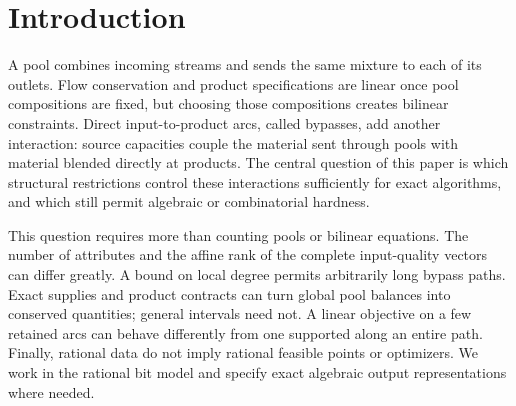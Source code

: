 \begin{abstract}
Pooling couples linear network flows through the requirement that every
outlet of a pool has the same mixture. We study which restrictions on
network structure, quality data and contracts make exact feasibility
and optimization tractable. Rational pooling threshold problems are
complete for the existential theory of the reals even with one attribute
and no bypasses, or with one pool and growing attribute dimension.
Fixed nonlinear parameter counts instead yield polynomial-size
basis-index certificates, but do not alone imply polynomial algorithms.
We give sparse and constant-data hardness constructions, exact algorithms
based on independent polyhedral blocks and planar path projections, and
contract algorithms using conserved quality masses and signed flow cuts.
The resulting boundaries distinguish product degree two from three under
specified pool interfaces and contract assumptions. Physical paths can
have exponentially many one-price responses using only two input
qualities. A one-pool extension has exponentially many isolated global
and strict local optima, yet admits a compact exact LP hull and polynomial
linear optimization. Finally, fixed interaction rank of an isolated
pool-block cost yields an exact quadratic-field algorithm and a
fixed-attribute Lagrangian oracle. All complexity and representation
claims distinguish feasibility, objective scope and exact arithmetic.
\end{abstract}

\section*{Introduction}
A pool combines incoming streams and sends the same mixture to each of
its outlets. Flow conservation and product specifications are linear
once pool compositions are fixed, but choosing those compositions
creates bilinear constraints. Direct input-to-product arcs, called
bypasses, add another interaction: source capacities couple the material
sent through pools with material blended directly at products.
The central question of this paper is which structural restrictions
control these interactions sufficiently for exact algorithms, and which
still permit algebraic or combinatorial hardness.

This question requires more than counting pools or bilinear equations.
The number of attributes and the affine rank of the complete input-quality
vectors can differ greatly. A bound on local degree permits arbitrarily
long bypass paths. Exact supplies and product contracts can turn global
pool balances into conserved quantities; general intervals need not.
A linear objective on a few retained arcs can behave differently from
one supported along an entire path. Finally, rational data do not imply
rational feasible points or optimizers. We work in the rational bit
model and specify exact algebraic output representations where needed.


